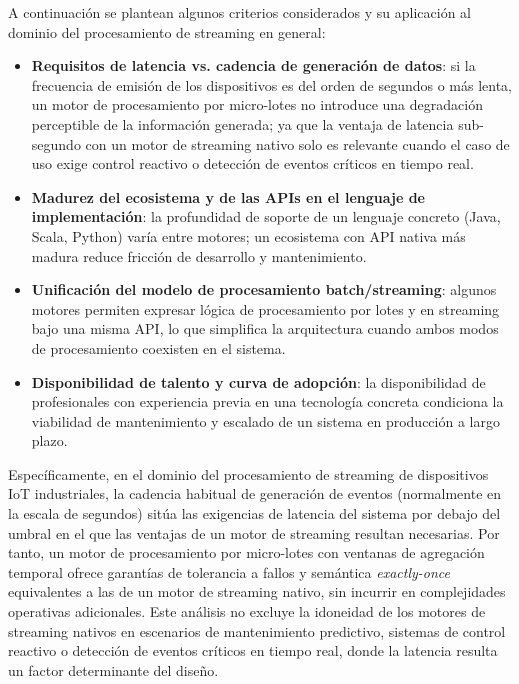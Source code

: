 A continuación se plantean algunos criterios considerados y su aplicación al dominio del procesamiento de streaming en general:

\begin{itemize}
    \item \textbf{Requisitos de latencia vs. cadencia de generación de datos}: si la frecuencia de emisión de los dispositivos es del orden de segundos o más lenta, un motor de procesamiento por micro-lotes no introduce una degradación perceptible de la información generada; ya que la ventaja de latencia sub-segundo con un motor de streaming nativo solo es relevante cuando el caso de uso exige control reactivo o detección de eventos críticos en tiempo real.
    \item \textbf{Madurez del ecosistema y de las APIs en el lenguaje de implementación}: la profundidad de soporte de un lenguaje concreto (Java, Scala, Python) varía entre motores; un ecosistema con API nativa más madura reduce fricción de desarrollo y mantenimiento.
    \item \textbf{Unificación del modelo de procesamiento batch/streaming}: algunos motores permiten expresar lógica de procesamiento por lotes y en streaming bajo una misma API, lo que simplifica la arquitectura cuando ambos modos de procesamiento coexisten en el sistema.
    \item \textbf{Disponibilidad de talento y curva de adopción}: la disponibilidad de profesionales con experiencia previa en una tecnología concreta condiciona la viabilidad de mantenimiento y escalado de un sistema en producción a largo plazo.
\end{itemize}

Específicamente, en el dominio del procesamiento de streaming de dispositivos IoT industriales, la cadencia habitual de generación de eventos (normalmente en la escala de segundos) sitúa las exigencias de latencia del sistema por debajo del umbral en el que las ventajas de un motor de streaming resultan necesarias. Por tanto, un motor de procesamiento por micro-lotes con ventanas de agregación temporal ofrece garantías de tolerancia a fallos y semántica \textit{exactly-once} equivalentes a las de un motor de streaming nativo, sin incurrir en complejidades operativas adicionales. Este análisis no excluye la idoneidad de los motores de streaming nativos en escenarios de mantenimiento predictivo, sistemas de control reactivo o detección de eventos críticos en tiempo real, donde la latencia resulta un factor determinante del diseño.

